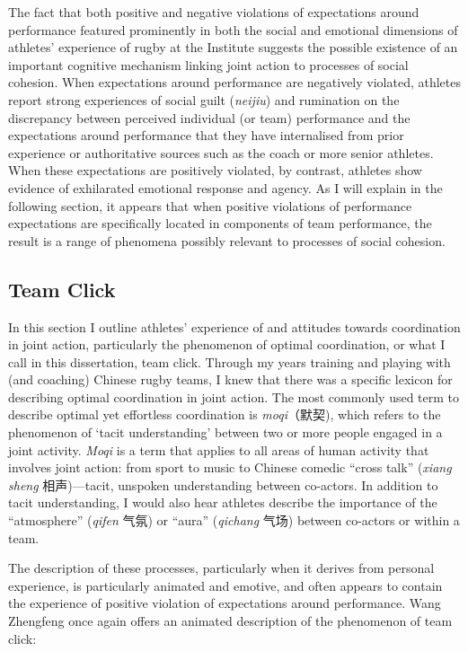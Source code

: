 \begin{CJK}{UTF8}{gbsn}
The fact that both positive and negative violations of expectations around performance featured prominently in both the social and emotional dimensions of athletes' experience of rugby at the Institute suggests the possible existence of an important cognitive mechanism linking joint action to processes of social cohesion.  When expectations around performance are negatively violated, athletes report strong experiences of social guilt (\textit{neijiu}) and rumination on the discrepancy between perceived individual (or team) performance and the expectations around performance that they have internalised from prior experience or authoritative sources such as the coach or more senior athletes.  When these expectations are positively violated, by contrast, athletes show evidence of exhilarated emotional response and agency.  As I will explain in the following section, it appears that when positive violations of performance expectations are specifically located in components of team performance, the result is a range of phenomena possibly relevant to processes of social cohesion.



\clearpage
\subsection{Team Click}
In this section I outline athletes' experience of and attitudes towards coordination in joint action, particularly the phenomenon of optimal coordination, or what I call in this dissertation, team click.  Through my years training and playing with (and coaching) Chinese rugby teams, I knew that there was a specific lexicon for describing optimal coordination in joint action.  The most commonly used term to describe optimal yet effortless coordination is \textit{moqi}（默契), which refers to the phenomenon of `tacit understanding' between two or more people engaged in a joint activity. \textit{Moqi} is a term that applies to all areas of human activity that involves joint action: from sport to music to Chinese comedic ``cross talk'' (\textit{xiang sheng} 相声)---tacit, unspoken understanding between co-actors.  In addition to tacit understanding, I would also hear athletes describe the importance of the ``atmosphere'' (\textit{qifen} 气氛) or ``aura'' (\textit{qichang} 气场) between co-actors or within a team.

The description of these processes, particularly when it derives from personal experience, is particularly animated and emotive, and often appears to contain the experience of positive violation of expectations around performance.  Wang Zhengfeng once again offers an animated description of the phenomenon of team click:


\end{CJK}

